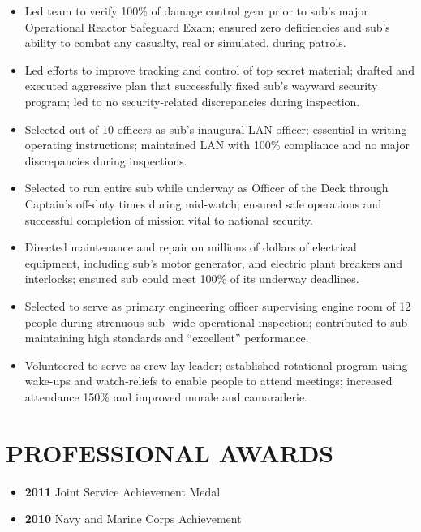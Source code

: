 \documentclass[10pt]{article}
\begin{document}
\begin{itemize}
\itemsep1pt\parskip0pt
\item
  Led team to verify 100\% of damage control gear prior to sub's major
  Operational Reactor Safeguard Exam; ensured zero deficiencies and
  sub's ability to combat any casualty, real or simulated, during
  patrols.
\item
  Led efforts to improve tracking and control of top secret material;
  drafted and executed aggressive plan that successfully fixed sub's
  wayward security program; led to no security-related discrepancies
  during inspection.
\item
  Selected out of 10 officers as sub's inaugural LAN officer; essential
  in writing operating instructions; maintained LAN with 100\%
  compliance and no major discrepancies during inspections.
\item
  Selected to run entire sub while underway as Officer of the Deck
  through Captain's off-duty times during mid-watch; ensured safe
  operations and successful completion of mission vital to national
  security.
\item
  Directed maintenance and repair on millions of dollars of electrical
  equipment, including sub's motor generator, and electric plant
  breakers and interlocks; ensured sub could meet 100\% of its underway
  deadlines.
\item
  Selected to serve as primary engineering officer supervising engine
  room of 12 people during strenuous sub- wide operational inspection;
  contributed to sub maintaining high standards and ``excellent''
  performance.
\item
  Volunteered to serve as crew lay leader; established rotational
  program using wake-ups and watch-reliefs to enable people to attend
  meetings; increased attendance 150\% and improved morale and
  camaraderie.
\end{itemize}

\section{PROFESSIONAL AWARDS}\label{professional-awards}

\begin{itemize}
\itemsep1pt\parskip0pt
\item
  \textbf{2011} Joint Service Achievement Medal
\item
  \textbf{2010} Navy and Marine Corps Achievement
\end{itemize}
\end{document}
